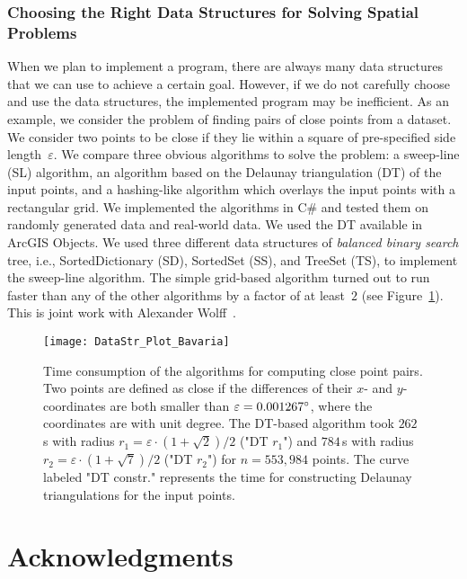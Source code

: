 \subsubsection{Choosing the Right Data Structures 
	for Solving Spatial Problems}

When we plan to implement a program, 
there are always many data structures that
we can use to achieve a certain goal.
However, if we do not carefully choose and use 
the data structures,
the implemented program may be inefficient.
As an example, we consider the problem of 
finding pairs of close points from a dataset. 
We consider two points to be close 
if they lie within a square of pre-specified 
side length~$\varepsilon$. 
We compare three obvious algorithms to solve the problem: 
a sweep-line (SL) algorithm, 
an algorithm based on the Delaunay triangulation (DT) 
of the input points, 
and a hashing-like algorithm 
which overlays the input points with a rectangular grid. 
We implemented the algorithms in C\# and tested them on 
randomly generated data and real-world data. 
We used the DT available in ArcGIS Objects. 
We used three different data structures
of \emph{balanced binary search} tree, 
i.e., SortedDictionary (SD), SortedSet (SS), and TreeSet (TS), 
to implement the sweep-line algorithm. 
The simple grid-based algorithm turned out to run faster than 
any of the other algorithms by a factor of at least~$2$ 
(see Figure~\ref{fig:Intro_DataStructure}).
This is joint work with 
Alexander Wolff~\parencite[see][]{Peng2014DataStr}.


\begin{figure}[tb]
\centering
\texttt{[image: DataStr\_Plot\_Bavaria]}
\caption{Time consumption of the algorithms
	for computing close point pairs. 
	Two points are defined as close if the differences 
	of their $x$- and $y$- coordinates are both smaller than
	$\varepsilon=0.001267 \degree$,
	where the coordinates are with unit degree. 
	The DT-based algorithm took $262\,$s 
	with radius $r_1=\varepsilon \cdot (1+\sqrt{2})/2$ 
	("DT $r_1$") and $784\,$s 
	with radius $r_2=\varepsilon \cdot (1+\sqrt{7})/2$ 
	("DT $r_2$") for $n=553{,}984$ points.
	The curve labeled "DT constr." represents 
	the time for constructing 
	Delaunay triangulations for the input points.
}
\label{fig:Intro_DataStructure}
\end{figure}

\clearpage
\section{Acknowledgments}


